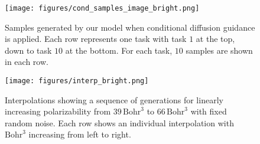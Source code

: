 \begin{figure}
    \centering
    \texttt{[image: figures/cond\_samples\_image\_bright.png]}
    \caption{Samples generated by our model when conditional diffusion guidance is applied. Each row represents one task with task $1$ at the top, down to task $10$ at the bottom. For each task, $10$ samples are shown in each row.}
    \label{fig:CondSampleExamples}
\end{figure}

\begin{figure}
    \centering
    \texttt{[image: figures/interp\_bright.png]}
    \caption{Interpolations showing a sequence of generations for linearly increasing polarizability from $39 \, \text{Bohr}^3$ to $66 \, \text{Bohr}^3$ with fixed random noise. Each row shows an individual interpolation with $\text{Bohr}^3$ increasing from left to right.}
    \label{fig:apdxMoreInterps}
\end{figure}

